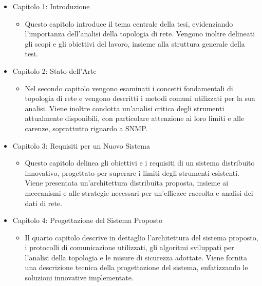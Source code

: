 \documentclass[target=bach,aauheader=,style=]{thud}
\begin{document}
\begin{itemize}
  \item Capitolo 1: Introduzione
  \begin{itemize}
    \item Questo capitolo introduce il tema centrale della tesi, evidenziando l'importanza dell'analisi della topologia di rete. Vengono inoltre delineati gli scopi e gli obiettivi del lavoro, insieme alla struttura generale della tesi.
  \end{itemize}

  \item Capitolo 2: Stato dell'Arte
    \begin{itemize}
      \item Nel secondo capitolo vengono esaminati i concetti fondamentali di topologia di rete e vengono descritti i metodi comuni utilizzati per la sua analisi. Viene inoltre condotta un'analisi critica degli strumenti attualmente disponibili, con particolare attenzione ai loro limiti e alle carenze, soprattutto riguardo a SNMP.
    \end{itemize}




  \item    Capitolo 3: Requisiti per un Nuovo Sistema
    \begin{itemize}
      \item Questo capitolo delinea gli obiettivi e i requisiti di un sistema distribuito innovativo, progettato per superare i limiti degli strumenti esistenti. Viene presentata un'architettura distribuita proposta, insieme ai meccanismi e alle strategie necessari per un'efficace raccolta e analisi dei dati di rete.
    \end{itemize}

  \item Capitolo 4: Progettazione del Sistema Proposto
    \begin{itemize}
      \item Il quarto capitolo descrive in dettaglio l'architettura del sistema proposto, i protocolli di comunicazione utilizzati, gli algoritmi sviluppati per l'analisi della topologia e le misure di sicurezza adottate. Viene fornita una descrizione tecnica della progettazione del sistema, enfatizzando le soluzioni innovative implementate.
    \end{itemize}


\end{itemize}
\end{document}
